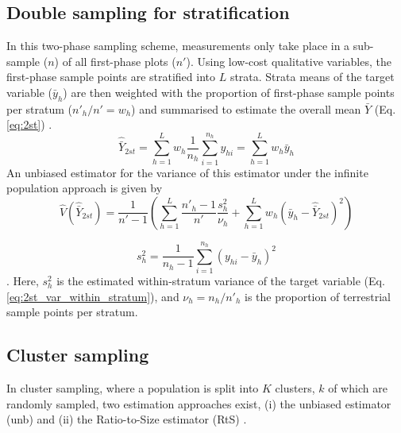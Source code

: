 \subsection{Double sampling for stratification}
\label{section:estimator_2st}
In this two-phase sampling scheme, measurements only take place in a sub-sample ($n$) of all first-phase plots ($n'$). Using low-cost qualitative variables, the first-phase sample points are stratified into $L$ strata. Strata means of the target variable ($\bar{y}_h$) are then weighted with the proportion of first-phase sample points per stratum ($n'_h/n'=w_h$) and summarised to estimate the overall mean $\bar{Y}$ (Eq. \ref{eq:2st}) \citep{Cochran_1977}.
\begin{equation}
\hat{\bar{Y}}_{2st}=\sum^L_{h=1}w_h\frac{1}{n_h}\sum_{i=1}^{n_h}y_{hi}=\sum^L_{h=1}w_h\bar{y}_h
\label{eq:2st}
\end{equation}
An unbiased estimator for the variance of this estimator under the infinite population approach \citep[see e.g.][]{Mandallaz_2008} is given by 
\begin{equation}
\hat{V}\left(\hat{\bar{Y}}_{2st}\right)=\frac{1}{n'-1}\left(\sum^L_{h=1}\frac{n'_h-1}{n'}\frac{s_h^2}{\nu_h}+\sum^L_{h=1}w_h\left(\bar{y}_h-\hat{\bar{Y}}_{2st}\right)^2\right)
\label{eq:2st_var}
\end{equation}

\begin{equation}
s_h^2=\frac{1}{n_h-1}\sum^{n_h}_{i=1}\left(y_{hi}-\bar{y}_h\right)^2
\label{eq:2st_var_within_stratum}
\end{equation}
\citep{Saborowski_2010}. Here, $s_h^2$ is the estimated within-stratum variance of the target variable (Eq. \ref{eq:2st_var_within_stratum}), and $\nu_h=n_h/n'_h$ is the proportion of terrestrial sample points per stratum.
\subsection{Cluster sampling}
In cluster sampling, where a population is split into $K$ clusters, $k$ of which are randomly sampled, two estimation approaches exist, (i) the unbiased estimator (unb) and (ii) the Ratio-to-Size estimator (RtS) \citep[][with $n=k$ and $N=K$]{Cochran_1977}.
